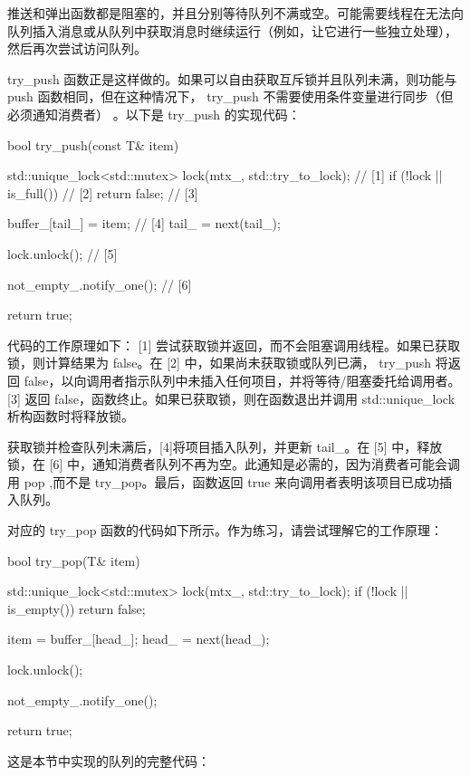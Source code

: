 推送和弹出函数都是阻塞的，并且分别等待队列不满或空。可能需要线程在无法向队列插入消息或从队列中获取消息时继续运行（例如，让它进行一些独立处理），然后再次尝试访问队列。

try\_push 函数正是这样做的。如果可以自由获取互斥锁并且队列未满，则功能与 push 函数相同，但在这种情况下， try\_push 不需要使用条件变量进行同步（但必须通知消费者） 。以下是 try\_push 的实现代码：

\begin{cpp}
bool try_push(const T& item) {
    std::unique_lock<std::mutex> lock(mtx_, std::try_to_lock); // [1]
    if (!lock || is_full()) { // [2]
        return false; // [3]
    }

    buffer_[tail_] = item; // [4]
    tail_ = next(tail_);

    lock.unlock(); // [5]

    not_empty_.notify_one(); // [6]

    return true;
}
\end{cpp}

代码的工作原理如下： [1] 尝试获取锁并返回，而不会阻塞调用线程。如果已获取锁，则计算结果为 false。在 [2] 中，如果尚未获取锁或队列已满， try\_push 将返回 false，以向调用者指示队列中未插入任何项目，并将等待/阻塞委托给调用者。[3] 返回 false，函数终止。如果已获取锁，则在函数退出并调用 std::unique\_lock 析构函数时将释放锁。

获取锁并检查队列未满后，[4]将项目插入队列，并更新 tail\_。在 [5] 中，释放锁，在 [6] 中，通知消费者队列不再为空。此通知是必需的，因为消费者可能会调用 pop ,而不是 try\_pop。最后，函数返回 true 来向调用者表明该项目已成功插入队列。

对应的 try\_pop 函数的代码如下所示。作为练习，请尝试理解它的工作原理：

\begin{cpp}
bool try_pop(T& item) {
    std::unique_lock<std::mutex> lock(mtx_, std::try_to_lock);
    if (!lock || is_empty()) {
        return false;
    }

    item = buffer_[head_];
    head_ = next(head_);

    lock.unlock();

    not_empty_.notify_one();

    return true;
}
\end{cpp}

这是本节中实现的队列的完整代码：

